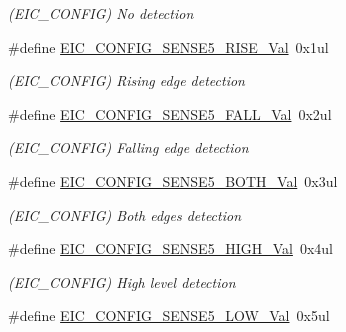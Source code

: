 \begin{DoxyCompactItemize}
\begin{DoxyCompactList}\small\item\em (E\+I\+C\+\_\+\+C\+O\+N\+F\+I\+G) No detection \end{DoxyCompactList}\item 
\hypertarget{group___s_a_m_l21___e_i_c_gaa79135e0c433132db7b3df88472fda74}{}\#define \hyperlink{group___s_a_m_l21___e_i_c_gaa79135e0c433132db7b3df88472fda74}{E\+I\+C\+\_\+\+C\+O\+N\+F\+I\+G\+\_\+\+S\+E\+N\+S\+E5\+\_\+\+R\+I\+S\+E\+\_\+\+Val}~0x1ul\label{group___s_a_m_l21___e_i_c_gaa79135e0c433132db7b3df88472fda74}

\begin{DoxyCompactList}\small\item\em (E\+I\+C\+\_\+\+C\+O\+N\+F\+I\+G) Rising edge detection \end{DoxyCompactList}\item 
\hypertarget{group___s_a_m_l21___e_i_c_ga2f575e054321eef78315a123006b62dc}{}\#define \hyperlink{group___s_a_m_l21___e_i_c_ga2f575e054321eef78315a123006b62dc}{E\+I\+C\+\_\+\+C\+O\+N\+F\+I\+G\+\_\+\+S\+E\+N\+S\+E5\+\_\+\+F\+A\+L\+L\+\_\+\+Val}~0x2ul\label{group___s_a_m_l21___e_i_c_ga2f575e054321eef78315a123006b62dc}

\begin{DoxyCompactList}\small\item\em (E\+I\+C\+\_\+\+C\+O\+N\+F\+I\+G) Falling edge detection \end{DoxyCompactList}\item 
\hypertarget{group___s_a_m_l21___e_i_c_ga020047d3418afa7b60b72bfc4872bfb0}{}\#define \hyperlink{group___s_a_m_l21___e_i_c_ga020047d3418afa7b60b72bfc4872bfb0}{E\+I\+C\+\_\+\+C\+O\+N\+F\+I\+G\+\_\+\+S\+E\+N\+S\+E5\+\_\+\+B\+O\+T\+H\+\_\+\+Val}~0x3ul\label{group___s_a_m_l21___e_i_c_ga020047d3418afa7b60b72bfc4872bfb0}

\begin{DoxyCompactList}\small\item\em (E\+I\+C\+\_\+\+C\+O\+N\+F\+I\+G) Both edges detection \end{DoxyCompactList}\item 
\hypertarget{group___s_a_m_l21___e_i_c_gafc521f838a152ea846c8ba29d2d7e578}{}\#define \hyperlink{group___s_a_m_l21___e_i_c_gafc521f838a152ea846c8ba29d2d7e578}{E\+I\+C\+\_\+\+C\+O\+N\+F\+I\+G\+\_\+\+S\+E\+N\+S\+E5\+\_\+\+H\+I\+G\+H\+\_\+\+Val}~0x4ul\label{group___s_a_m_l21___e_i_c_gafc521f838a152ea846c8ba29d2d7e578}

\begin{DoxyCompactList}\small\item\em (E\+I\+C\+\_\+\+C\+O\+N\+F\+I\+G) High level detection \end{DoxyCompactList}\item 
\hypertarget{group___s_a_m_l21___e_i_c_ga4a2958b65315240e85c9bf06c9c92305}{}\#define \hyperlink{group___s_a_m_l21___e_i_c_ga4a2958b65315240e85c9bf06c9c92305}{E\+I\+C\+\_\+\+C\+O\+N\+F\+I\+G\+\_\+\+S\+E\+N\+S\+E5\+\_\+\+L\+O\+W\+\_\+\+Val}~0x5ul\label{group___s_a_m_l21___e_i_c_ga4a2958b65315240e85c9bf06c9c92305}


\end{DoxyCompactItemize}
